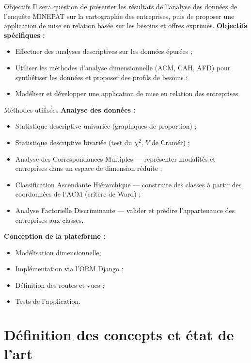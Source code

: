 \documentclass[aspectratio=169, 10pt]{beamer}
\begin{document}
\begin{frame}{Objectifs}
    Il sera question de présenter les résultats de l'analyse des données de l'enquête MINEPAT sur la cartographie des entreprises, puis de proposer une application de mise en relation basée sur les besoins et offres exprimés.
    \vspace{4pt}
    \textbf{Objectifs spécifiques :}
    \begin{itemize}
        \item Effectuer des analyses descriptives sur les données épurées ;
        \item Utiliser les méthodes d'analyse dimensionnelle (ACM, CAH, AFD) pour synthétiser les données et proposer des profils de besoins ;
        \item Modéliser et développer une application de mise en relation des entreprises.
    \end{itemize}
\end{frame}

\begin{frame}{Méthodes utilisées}
    \textbf{Analyse des données :}
    \begin{itemize}
        \item Statistique descriptive univariée (graphiques de proportion) ;
        \item Statistique descriptive bivariée (test du $\chi^2$, $V$ de Cramér) ;
        \item Analyse des Correspondances Multiples — représenter modalités et entreprises dans un espace de dimension réduite ;
        \item Classification Ascendante Hiérarchique — construire des classes à partir des coordonnées de l'ACM (critère de Ward) ;
        \item Analyse Factorielle Discriminante — valider et prédire l'appartenance des entreprises aux classes.
    \end{itemize}
    \textbf{Conception de la plateforme :}
    \begin{itemize}
        \item Modélisation dimensionnelle;
        \item Implémentation via l'ORM Django ;
        \item Définition des routes et vues ;
        \item Tests de l'application.
    \end{itemize}
\end{frame}

\section{Définition des concepts et état de l'art}
\end{document}
